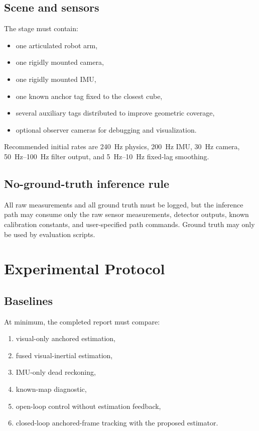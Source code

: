 \documentclass[11pt]{article}
\begin{document}
\subsection{Scene and sensors}
The stage must contain:
\begin{itemize}[leftmargin=1.5em]
    \item one articulated robot arm,
    \item one rigidly mounted camera,
    \item one rigidly mounted IMU,
    \item one known anchor tag fixed to the closest cube,
    \item several auxiliary tags distributed to improve geometric coverage,
    \item optional observer cameras for debugging and visualization.
\end{itemize}
Recommended initial rates are \SI{240}{Hz} physics, \SI{200}{Hz} IMU, \SI{30}{Hz} camera, \SIrange{50}{100}{Hz} filter output, and \SIrange{5}{10}{Hz} fixed-lag smoothing.

\subsection{No-ground-truth inference rule}
All raw measurements and all ground truth must be logged, but the inference path may consume only the raw sensor measurements, detector outputs, known calibration constants, and user-specified path commands. Ground truth may only be used by evaluation scripts.

\section{Experimental Protocol}
\subsection{Baselines}
At minimum, the completed report must compare:
\begin{enumerate}[leftmargin=1.5em]
    \item visual-only anchored estimation,
    \item fused visual-inertial estimation,
    \item IMU-only dead reckoning,
    \item known-map diagnostic,
    \item open-loop control without estimation feedback,
    \item closed-loop anchored-frame tracking with the proposed estimator.
\end{enumerate}
\end{document}
